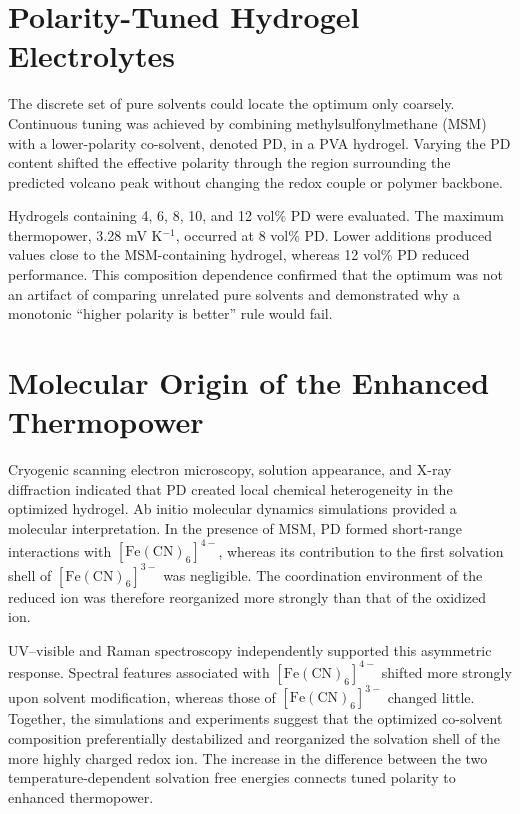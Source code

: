\documentclass[a4paper,12pt]{report}
\begin{document}
\section{Polarity-Tuned Hydrogel Electrolytes}

The discrete set of pure solvents could locate the optimum only coarsely.
Continuous tuning was achieved by combining methylsulfonylmethane (MSM) with a
lower-polarity co-solvent, denoted PD, in a PVA hydrogel. Varying the PD content
shifted the effective polarity through the region surrounding the predicted
volcano peak without changing the redox couple or polymer backbone.

Hydrogels containing 4, 6, 8, 10, and 12 vol\% PD were evaluated. The maximum
thermopower, 3.28 mV K$^{-1}$, occurred at 8 vol\% PD. Lower additions
produced values close to the MSM-containing hydrogel, whereas 12 vol\% PD
reduced performance. This composition dependence confirmed that the optimum
was not an artifact of comparing unrelated pure solvents and demonstrated why
a monotonic ``higher polarity is better'' rule would fail.

\section{Molecular Origin of the Enhanced Thermopower}

Cryogenic scanning electron microscopy, solution appearance, and X-ray
diffraction indicated that PD created local chemical heterogeneity in the
optimized hydrogel. Ab initio molecular dynamics simulations provided a
molecular interpretation. In the presence of MSM, PD formed short-range
interactions with $[\mathrm{Fe(CN)}_6]^{4-}$, whereas its contribution to the
first solvation shell of $[\mathrm{Fe(CN)}_6]^{3-}$ was negligible. The
coordination environment of the reduced ion was therefore reorganized more
strongly than that of the oxidized ion.

UV--visible and Raman spectroscopy independently supported this asymmetric
response. Spectral features associated with
$[\mathrm{Fe(CN)}_6]^{4-}$ shifted more strongly upon solvent modification,
whereas those of $[\mathrm{Fe(CN)}_6]^{3-}$ changed little. Together, the
simulations and experiments suggest that the optimized co-solvent composition
preferentially destabilized and reorganized the solvation shell of the more
highly charged redox ion. The increase in the difference between the two
temperature-dependent solvation free energies connects tuned polarity to
enhanced thermopower.
\end{document}
